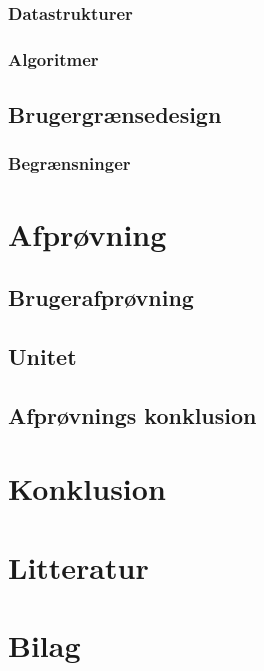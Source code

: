 \documentclass[final]{rapport1}
\begin{document}
\subsection{Datastrukturer}

\subsection{Algoritmer}

\section{Brugergrænsedesign}




\subsection{Begrænsninger}

\chapter{Afprøvning}

\section{Brugerafprøvning}

\section{Unitet}

\section{Afprøvnings konklusion}


\chapter{Konklusion}

\chapter{Litteratur}

\chapter{Bilag}
\end{document}
